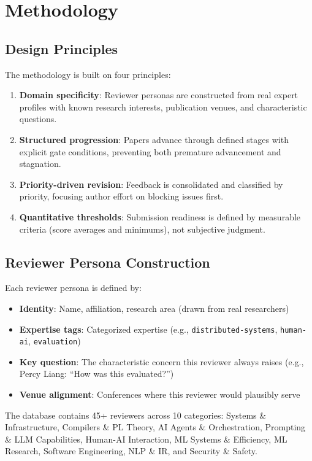\section{Methodology}

\subsection{Design Principles}

The methodology is built on four principles:

\begin{enumerate}
    \item \textbf{Domain specificity}: Reviewer personas are constructed from real expert profiles with known research interests, publication venues, and characteristic questions.
    \item \textbf{Structured progression}: Papers advance through defined stages with explicit gate conditions, preventing both premature advancement and stagnation.
    \item \textbf{Priority-driven revision}: Feedback is consolidated and classified by priority, focusing author effort on blocking issues first.
    \item \textbf{Quantitative thresholds}: Submission readiness is defined by measurable criteria (score averages and minimums), not subjective judgment.
\end{enumerate}

\subsection{Reviewer Persona Construction}

Each reviewer persona is defined by:
\begin{itemize}
    \item \textbf{Identity}: Name, affiliation, research area (drawn from real researchers)
    \item \textbf{Expertise tags}: Categorized expertise (e.g., \texttt{distributed-systems}, \texttt{human-ai}, \texttt{evaluation})
    \item \textbf{Key question}: The characteristic concern this reviewer always raises (e.g., Percy Liang: ``How was this evaluated?'')
    \item \textbf{Venue alignment}: Conferences where this reviewer would plausibly serve
\end{itemize}

The database contains 45+ reviewers across 10 categories: Systems \& Infrastructure, Compilers \& PL Theory, AI Agents \& Orchestration, Prompting \& LLM Capabilities, Human-AI Interaction, ML Systems \& Efficiency, ML Research, Software Engineering, NLP \& IR, and Security \& Safety.


